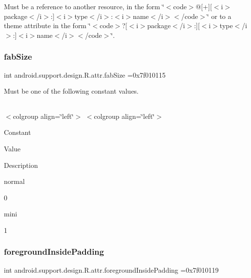 Must be a reference to another resource, in the form \char`\"{}$<$code$>$@\mbox{[}+\mbox{]}\mbox{[}$<$i$>$package$<$/i$>$\+:\mbox{]}$<$i$>$type$<$/i$>$\+:$<$i$>$name$<$/i$>$$<$/code$>$\char`\"{} or to a theme attribute in the form \char`\"{}$<$code$>$?\mbox{[}$<$i$>$package$<$/i$>$\+:\mbox{]}\mbox{[}$<$i$>$type$<$/i$>$\+:\mbox{]}$<$i$>$name$<$/i$>$$<$/code$>$\char`\"{}. \mbox{\label{classandroid_1_1support_1_1design_1_1R_1_1attr_a205255b0f0a29d2da84c1e91a3acf86b}} 
\subsubsection{\texorpdfstring{fab\+Size}{fabSize}}
{\footnotesize\ttfamily int android.\+support.\+design.\+R.\+attr.\+fab\+Size =0x7f010115\hspace{0.3cm}{\ttfamily [static]}}

Must be one of the following constant values.

\tabulinesep=1mm
\begin{longtabu} spread 0pt [c]{*{0}{|X[-1]}|}
\hline
\end{longtabu}
$<$colgroup align=\char`\"{}left\char`\"{}$>$ $<$colgroup align=\char`\"{}left\char`\"{}$>$ 

Constant

Value

Description 

{\ttfamily normal}

0

{\ttfamily mini}

1\mbox{\label{classandroid_1_1support_1_1design_1_1R_1_1attr_afbf955c1dce92071aaf0b595e0083cb5}} 
\subsubsection{\texorpdfstring{foreground\+Inside\+Padding}{foregroundInsidePadding}}
{\footnotesize\ttfamily int android.\+support.\+design.\+R.\+attr.\+foreground\+Inside\+Padding =0x7f010119\hspace{0.3cm}{\ttfamily [static]}}

